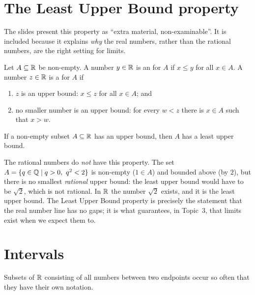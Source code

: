 \section{The Least Upper Bound property}\label{sec:lub}

\begin{sourcenote}
The slides present this property as ``extra material, non-examinable''. It is included because it explains
\emph{why} the real numbers, rather than the rational numbers, are the right setting for limits.
\end{sourcenote}

\begin{definition}
Let $A\subseteq\mathbb{R}$ be non-empty. A number $y\in\mathbb{R}$ is an  for $A$ if $x\le y$ for all
$x\in A$. A number $z\in\mathbb{R}$ is a  for $A$ if
\begin{enumerate}[label=(\roman*)]
  \item $z$ is an upper bound: $x\le z$ for all $x\in A$; and
  \item no smaller number is an upper bound: for every $w<z$ there is $x\in A$ such that $x>w$.
\end{enumerate}
\end{definition}

\begin{principle}
If a non-empty subset $A\subseteq\mathbb{R}$ has an upper bound, then $A$ has a least upper bound. 
\end{principle}

The rational numbers do \emph{not} have this property. The set $A=\{q\in\mathbb{Q}\mid q>0,\ q^2<2\}$ is non-empty
($1\in A$) and bounded above (by $2$), but there is no smallest \emph{rational} upper bound: the least upper
bound would have to be $\sqrt2$, which is not rational. In $\mathbb{R}$ the number $\sqrt2$ exists, and it is the least
upper bound. The Least Upper Bound property is precisely the statement that the real number line has no
gaps; it is what guarantees, in Topic~3, that limits exist when we expect them to.

\section{Intervals}\label{sec:intervals}

Subsets of $\mathbb{R}$ consisting of all numbers between two endpoints occur so often that they have their own
notation.

